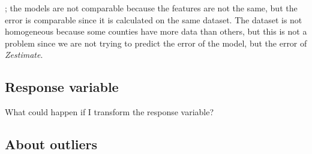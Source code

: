    
; the models are not comparable because the features are not the same, but the error is comparable since it is calculated on the same dataset. The dataset is not homogeneous because some counties have more data than others, but this is not a problem since we are not trying to predict the error of the model, but the error of \textit{Zestimate}.


\subsection{Response variable}

What could happen if I transform the response variable?
    
\subsection{About outliers}